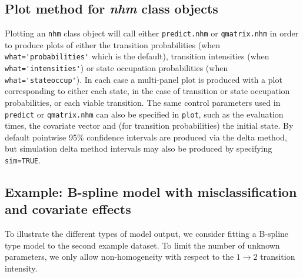 \documentclass{article}
\numberwithin{equation}{section}
\begin{document}
\subsection{Plot method for {\it nhm} class objects}

Plotting an \verb!nhm! class object will call either \verb!predict.nhm! or \verb!qmatrix.nhm! in order to produce plots of either the transition probabilities (when \verb!what='probabilities'! which is the default), transition intensities (when \verb!what='intensities'!) or state occupation probabilities (when \verb!what='stateoccup'!). In each case a multi-panel plot is produced with a plot corresponding to either each state, in the case of transition or state occupation probabilities, or each viable transition. The same control parameters used in \verb!predict! or \verb!qmatrix.nhm! can also be specified in \verb!plot!, such as the evaluation times, the covariate vector and (for transition probabilities) the initial state. By default pointwise 95\% confidence intervals are produced via the delta method, but simulation delta method intervals may also be produced by specifying \verb!sim=TRUE!. 


\subsection{Example: B-spline model with misclassification and covariate effects}
\label{sec:bspline_example}

To illustrate the different types of model output, we consider fitting a B-spline type model to the second example dataset. To limit the number of unknown parameters, we only allow non-homogeneity with respect to the $1 \rightarrow 2$ transition intensity.
\end{document}
